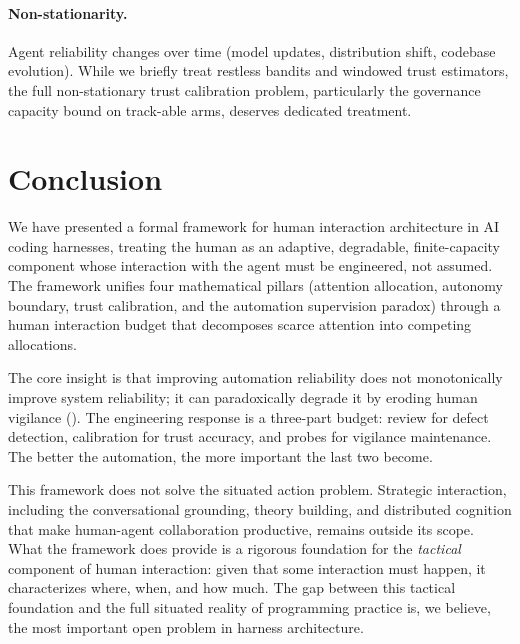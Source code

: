 \documentclass[11pt, a4paper, copyright]{googledeepmind}
\begin{document}
\paragraph{Non-stationarity.} Agent reliability changes over time (model updates, distribution shift, codebase evolution). While we briefly treat restless bandits \citep{whittle1988restless} and windowed trust estimators, the full non-stationary trust calibration problem, particularly the governance capacity bound on track-able arms, deserves dedicated treatment.

\section{Conclusion}
\label{sec:conclusion}

We have presented a formal framework for human interaction architecture in AI coding harnesses, treating the human as an adaptive, degradable, finite-capacity component whose interaction with the agent must be engineered, not assumed. The framework unifies four mathematical pillars (attention allocation, autonomy boundary, trust calibration, and the automation supervision paradox) through a human interaction budget that decomposes scarce attention into competing allocations.

The core insight is that improving automation reliability does not monotonically improve system reliability; it can paradoxically degrade it by eroding human vigilance (). The engineering response is a three-part budget: review for defect detection, calibration for trust accuracy, and probes for vigilance maintenance. The better the automation, the more important the last two become.

This framework does not solve the situated action problem. Strategic interaction, including the conversational grounding, theory building, and distributed cognition that make human-agent collaboration productive, remains outside its scope. What the framework does provide is a rigorous foundation for the \emph{tactical} component of human interaction: given that some interaction must happen, it characterizes where, when, and how much. The gap between this tactical foundation and the full situated reality of programming practice is, we believe, the most important open problem in harness architecture.


\end{document}

